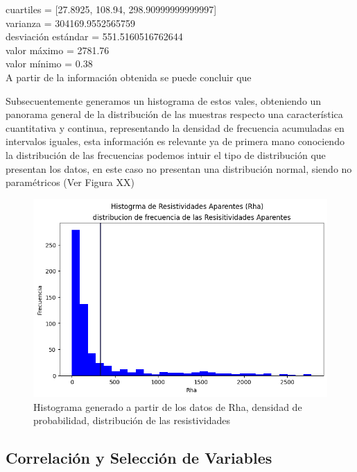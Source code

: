 \documentclass[sn-mathphys,Numbered]{sn-jnl}%
\theoremstyle{thmstyleone}%
\theoremstyle{thmstyletwo}%
\theoremstyle{thmstylethree}%
\begin{document}
cuartiles = [27.8925, 108.94, 298.90999999999997]\\

varianza = 304169.9552565759\\

desviación estándar = 551.5160516762644\\

valor máximo = 2781.76\\

valor mínimo = 0.38\\

A partir de la información obtenida se puede concluir que 

Subsecuentemente generamos un histograma de estos vales, obteniendo un panorama general de la distribución de las muestras respecto una característica cuantitativa y continua, representando la densidad de frecuencia acumuladas en intervalos iguales,\cite{Gutierrez2013} esta información es relevante ya de primera mano conociendo la distribución de las frecuencias podemos intuir el tipo de distribución que presentan los datos, en este caso no presentan una distribución normal, siendo no paramétricos (Ver Figura XX)

\begin{figure}[H]
	\centering
	\includegraphics[width=0.9\linewidth]{imagenes/Histograma_Rha}
	\caption[Figura]{Histograma generado a partir de los datos de Rha, densidad de probabilidad, distribución de las resistividades}
	\label{fig:histogramarha}
\end{figure}



\subsection{Correlación y Selección de Variables}\label{subsec5}
\end{document}
